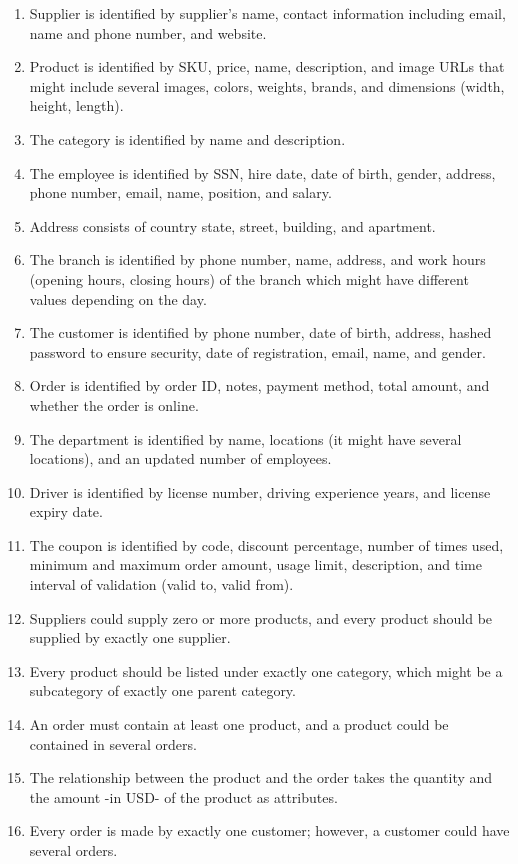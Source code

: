 \documentclass[11pt]{article}
\begin{document}
\begin{enumerate}
  \item Supplier is identified by supplier's name, contact information including email, name and phone number, and website.
  \item Product is identified by SKU, price, name, description, and image URLs that might include several images, colors, weights, brands, and dimensions (width, height, length).
  \item The category is identified by name and description.
  \item The employee is identified by SSN, hire date, date of birth, gender, address, phone number, email, name, position, and salary.
  \item Address consists of country state, street, building, and apartment.
  \item The branch is identified by phone number, name, address, and work hours (opening hours, closing hours) of the branch which might have different values depending on the day.
  \item The customer is identified by phone number, date of birth, address, hashed password to ensure security, date of registration, email, name, and gender.
  \item Order is identified by order ID, notes, payment method, total amount, and whether the order is online.
  \item The department is identified by name, locations (it might have several locations), and an updated number of employees.
  \item Driver is identified by license number, driving experience years, and license expiry date.
  \item The coupon is identified by code, discount percentage, number of times used, minimum and maximum order amount, usage limit, description, and time interval of validation (valid to, valid from).
  \item Suppliers could supply zero or more products, and every product should be supplied by exactly one supplier.
  \item Every product should be listed under exactly one category, which might be a subcategory of exactly one parent category.
  \item An order must contain at least one product, and a product could be contained in several orders.
  \item The relationship between the product and the order takes the quantity and the amount -in USD- of the product as attributes.
  \item Every order is made by exactly one customer; however, a customer could have several orders.

\end{enumerate}
\end{document}
